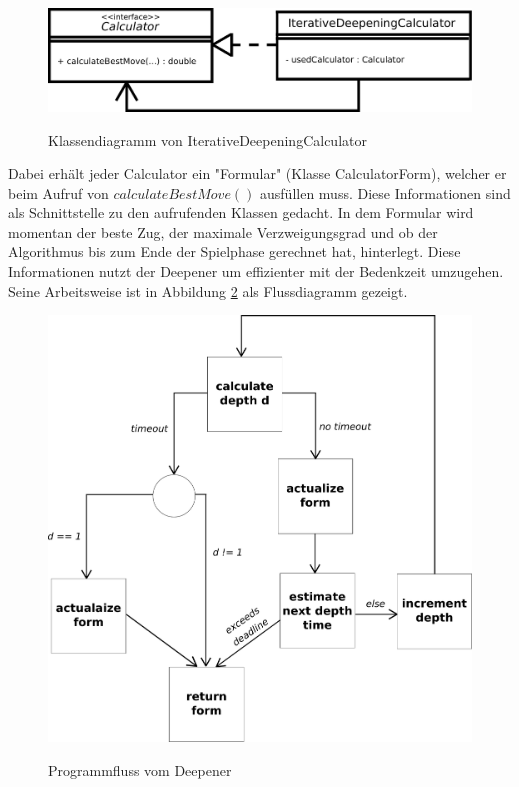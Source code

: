 \begin{figure}[h]
	\begin{center}
		\includegraphics[scale=0.4]{deepener-classdiagram}
		\label{fig::IterativeDeepeningCalculator-classdiagram}
		\caption{Klassendiagramm von IterativeDeepeningCalculator}
	\end{center}
\end{figure}
Dabei erhält jeder Calculator ein "Formular" (Klasse CalculatorForm), welcher er beim Aufruf von $calculateBestMove()$ ausfüllen muss. Diese Informationen sind als Schnittstelle zu den aufrufenden Klassen gedacht. In dem Formular wird momentan der beste Zug, der maximale Verzweigungsgrad und ob der Algorithmus bis zum Ende der Spielphase gerechnet hat, hinterlegt. Diese Informationen nutzt der Deepener um effizienter mit der Bedenkzeit umzugehen. Seine Arbeitsweise ist in Abbildung \ref{fig::Deepener-Flow-Chart} als Flussdiagramm gezeigt.\\
\begin{figure}[h]
	\begin{center}
		\includegraphics[scale=0.3]{deepener-flow-chart}
		\label{fig::Deepener-Flow-Chart}
		\caption{Programmfluss vom Deepener}
	\end{center}
\end{figure}
